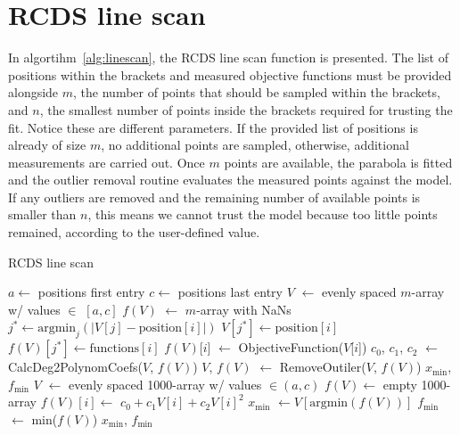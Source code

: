 \section{RCDS line scan}
In algortihm~\ref{alg:linescan}, the RCDS line scan function is presented. The list of positions within the brackets and measured objective functions must be provided alongside $m$, the number of points that should be sampled within the brackets, and $n$, the smallest number of points inside the brackets required for trusting the fit. Notice these are different parameters. If the provided list of positions is already of size $m$, no additional points are sampled, otherwise, additional measurements are carried out. Once $m$ points are available,  the parabola is fitted and the outlier removal routine evaluates the measured points against the model. If any outliers are removed and the remaining number of available points is smaller than $n$, this means we cannot trust the model because too little points remained, according to the user-defined value.

\begin{algorithm}
    \caption{RCDS line scan}\label{alg:linescan}
    \begin{algorithmic}[1]
        \State $a\gets$ positions first entry
        \State $c\gets$ positions last entry
        \State $V$ $\gets$ evenly spaced $m$-array w/ values $\in$ $[a, c]$
        \State $f(V)$ $\gets$ $m$-array with NaNs
            \State $j^*\gets \text{argmin}_{j}(|V[j] - \text{position}[i]|)$
            \State $V[j^*]\gets \text{position}[i]$
            \State $f(V)[j^*]\gets \text{functions}[i]$
        \EndFor
            \State $f(V)$[$i$] $\gets$ ObjectiveFunction($V$[$i$])
        \EndFor
        \State $c_0$, $c_1$, $c_2$ $\gets$ CalcDeg2PolynomCoefs($V$, $f(V)$)
        \State $V$, $f(V)$ $\gets$ RemoveOutiler($V$, $f(V)$)
            \State \Return $x_{\text{min}}$, $f_{\text{min}}$
        \EndIf
        \State $V$ $\gets$ evenly spaced 1000-array w/ values $\in(a,c)$
        \State $f(V)\gets$ empty 1000-array
            \State $f(V)[i] \gets$ $c_0+c_1V[i]+c_2V[i]^2$
        \EndFor
        \State $x_{\text{min}}$ $\gets V[\text{argmin}(f(V))]$
        \State $f_\text{min}$ $\gets$ min($f(V)$)
        \State \Return $x_{\text{min}}$, $f_\text{min}$
    \EndFunction
    \end{algorithmic}
    \end{algorithm}

